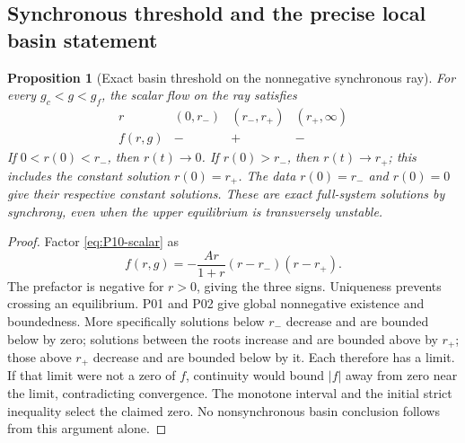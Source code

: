 \documentclass[11pt]{article}
\newtheorem{proposition}[theorem]{Proposition}
\theoremstyle{definition}
\theoremstyle{remark}
\begin{document}
\subsection{Synchronous threshold and the precise local basin statement}
\label{slot:P10-4}

\begin{proposition}[Exact basin threshold on the nonnegative synchronous ray]
\label{prop:P10-ray}
For every $g_c<g<g_f$, the scalar flow on the ray satisfies
\[
 \begin{array}{c|ccc}
 r&(0,r_-)&(r_-,r_+)&(r_+,\infty)\\ \hline
 f(r,g)&-&+&-
 \end{array}
\]
If $0<r(0)<r_-$, then $r(t)\to0$. If $r(0)>r_-$, then
$r(t)\to r_+$; this includes the constant solution $r(0)=r_+$.
The data $r(0)=r_-$ and $r(0)=0$ give their respective constant
solutions. These are exact full-system solutions by synchrony,
even when the upper equilibrium is transversely unstable.
\end{proposition}
\begin{proof}
Factor \eqref{eq:P10-scalar} as
\begin{equation}
 f(r,g)=-\frac{Ar}{1+r}(r-r_-)(r-r_+).
 \label{eq:P10-ray-factor}
\end{equation}
The prefactor is negative for $r>0$, giving the three signs.
Uniqueness prevents crossing an equilibrium. P01 and P02 give global
nonnegative existence and boundedness. More specifically solutions
below $r_-$ decrease and are bounded below by zero; solutions between
the roots increase and are bounded above by $r_+$; those above $r_+$
decrease and are bounded below by it. Each therefore has a limit.
If that limit were not a zero of $f$, continuity would bound $|f|$
away from zero near the limit, contradicting convergence. The monotone
interval and the initial strict inequality select the claimed zero.
No nonsynchronous basin conclusion follows from this argument alone.
\end{proof}
\end{document}
